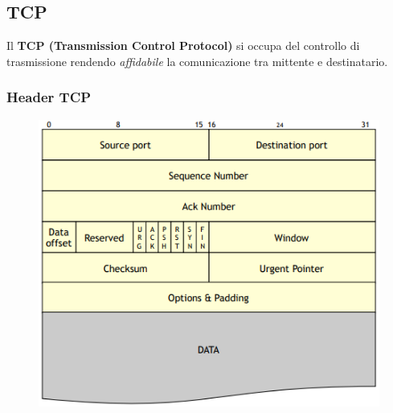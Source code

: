 \documentclass{article}
\begin{document}
        \subsection{TCP}
            Il \textbf{TCP (Transmission Control Protocol)} si occupa del controllo di trasmissione rendendo \textit{affidabile} la comunicazione tra mittente e destinatario.

            \subsubsection{Header TCP}
                \begin{figure}[H]
                    \centering
                    \includegraphics[width=\textwidth]{pic/header_tcp.png}
                    \label{Header TCP}
                \end{figure}
\end{document}
